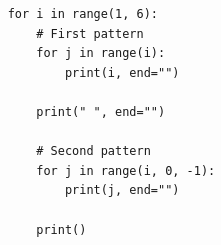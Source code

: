 \begin{verbatim}
    for i in range(1, 6):
        # First pattern
        for j in range(i):
            print(i, end="")
        
        print(" ", end="")
        
        # Second pattern
        for j in range(i, 0, -1):
            print(j, end="")
        
        print()
\end{verbatim}